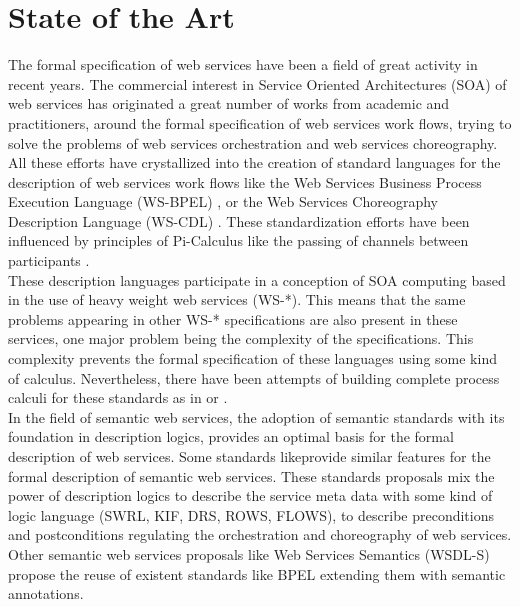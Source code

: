 \section{State of the Art}
The formal specification of web services have been a field of great activity in recent years. The commercial interest in
Service Oriented Architectures (SOA) of web services has originated a great number of works from academic and practitioners, around the formal
specification of web services work flows, trying to solve the problems of web services orchestration and web services
choreography.  All these efforts have crystallized into the creation of standard languages for
the description of web services work flows like the Web Services Business Process Execution Language (WS-BPEL)
\cite{Fu04analysisof},  or the Web Services Choreography Description Language (WS-CDL)
\cite{Burdett:05:WSC}. These standardization efforts have been influenced by principles of Pi-Calculus like the passing
of channels between participants \cite{chan08chor}. \\

These description languages participate in a conception of SOA computing based in the use of heavy weight web services
(WS-*). This means that the same problems appearing in other WS-* specifications are also present in these services, one
major problem being the complexity of the specifications. This complexity prevents the formal specification of these
languages using some kind of calculus. Nevertheless, there have been attempts of building complete process calculi for
these standards as in \cite{Lucchi05api-calculus} or \cite{Lapadula07acalculus}. \\

In the field of semantic web services, the adoption of semantic standards with its foundation in description logics,
provides an optimal basis for the formal description of web services. Some standards likeprovide similar features for the formal description of semantic web services. These standards proposals
mix the power of description logics to describe the service meta data with some kind of logic language (SWRL, KIF, DRS,
ROWS, FLOWS),  to describe preconditions and postconditions regulating the orchestration and choreography of web
services. Other semantic web services proposals like Web Services Semantics (WSDL-S)  \cite{wsdls}  propose the reuse of
existent standards like BPEL extending them with semantic annotations.\\

